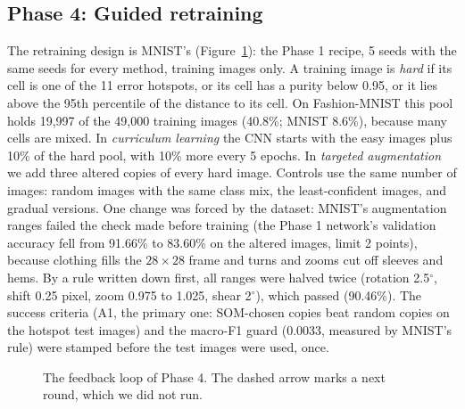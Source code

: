\documentclass[11pt]{article}
\begin{document}
\subsection{Phase 4: Guided retraining}

The retraining design is MNIST's (Figure~\ref{fig:loop}): the Phase 1 recipe, 5 seeds with the same seeds for every method, training images only.
A training image is \emph{hard} if its cell is one of the 11 error hotspots, or its cell has a purity below 0.95, or it lies above the 95th percentile of the distance to its cell. On Fashion-MNIST this pool holds 19,997 of the 49,000 training images (40.8\%; MNIST 8.6\%), because many cells are mixed.
In \emph{curriculum learning} the CNN starts with the easy images plus 10\% of the hard pool, with 10\% more every 5 epochs. In \emph{targeted augmentation} we add three altered copies of every hard image. Controls use the same number of images: random images with the same class mix, the least-confident images, and gradual versions.
One change was forced by the dataset: MNIST's augmentation ranges failed the check made before training (the Phase 1 network's validation accuracy fell from 91.66\% to 83.60\% on the altered images, limit 2 points), because clothing fills the $28\times28$ frame and turns and zooms cut off sleeves and hems. By a rule written down first, all ranges were halved twice (rotation 2.5$^\circ$, shift 0.25 pixel, zoom 0.975 to 1.025, shear 2$^\circ$), which passed (90.46\%).
The success criteria (A1, the primary one: SOM-chosen copies beat random copies on the hotspot test images) and the macro-F1 guard (0.0033, measured by MNIST's rule) were stamped before the test images were used, once.

\begin{figure}[H]
\centering
{}
\caption{The feedback loop of Phase 4. The dashed arrow marks a next round, which we did not run.}
\label{fig:loop}
\end{figure}
\end{document}

